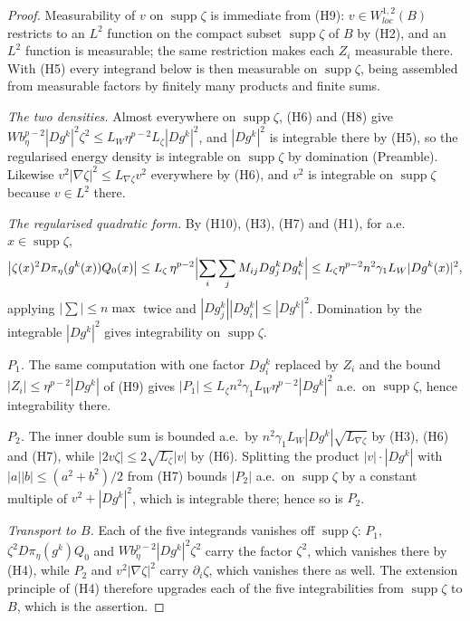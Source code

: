 \begin{proof}
Measurability of $v$ on $\operatorname{supp}\zeta$ is immediate from (H9):
$v\in W^{1,2}_{loc}(B)$ restricts to an $L^2$ function on the compact subset
$\operatorname{supp}\zeta$ of $B$ by (H2), and an $L^2$ function is
measurable; the same restriction makes each $Z_i$ measurable there.  With (H5)
every integrand below is then measurable on $\operatorname{supp}\zeta$, being
assembled from measurable factors by finitely many products and finite sums.

\emph{The two densities.}  Almost everywhere on $\operatorname{supp}\zeta$,
(H6) and (H8) give
$Wb_\eta^{p-2}|Dg^k|^2\zeta^2\le L_W\eta^{p-2}L_\zeta|Dg^k|^2$, and
$|Dg^k|^2$ is integrable there by (H5), so the regularised energy density is
integrable on $\operatorname{supp}\zeta$ by domination (Preamble).  Likewise
$v^2|\nabla\zeta|^2\le L_{\nabla\zeta}v^2$ everywhere by (H6), and $v^2$ is
integrable on $\operatorname{supp}\zeta$ because $v\in L^2$ there.

\emph{The regularised quadratic form.}  By (H10), (H3), (H7) and (H1), for
a.e.\ $x\in\operatorname{supp}\zeta$,
\[
\bigl|\zeta(x)^2D\pi_\eta(g^k(x))Q_0(x)\bigr|
\le L_\zeta\,\eta^{p-2}\Bigl|\sum_i\sum_jM_{ij}Dg^k_jDg^k_i\Bigr|
\le L_\zeta\eta^{p-2}n^2\gamma_1L_W|Dg^k(x)|^2 ,
\]
applying $|\sum|\le n\max$ twice and $|Dg^k_j||Dg^k_i|\le|Dg^k|^2$.
Domination by the integrable $|Dg^k|^2$ gives integrability on
$\operatorname{supp}\zeta$.

\emph{$P_1$.}  The same computation with one factor $Dg^k_i$ replaced by $Z_i$
and the bound $|Z_i|\le\eta^{p-2}|Dg^k|$ of (H9) gives
$|P_1|\le L_\zeta n^2\gamma_1L_W\eta^{p-2}|Dg^k|^2$ a.e.\ on
$\operatorname{supp}\zeta$, hence integrability there.

\emph{$P_2$.}  The inner double sum is bounded a.e.\ by
$n^2\gamma_1L_W|Dg^k|\sqrt{L_{\nabla\zeta}}$ by (H3), (H6) and (H7), while
$|2v\zeta|\le2\sqrt{L_\zeta}|v|$ by (H6).  Splitting the product
$|v|\cdot|Dg^k|$ with $|a||b|\le(a^2+b^2)/2$ from (H7) bounds $|P_2|$ a.e.\ on
$\operatorname{supp}\zeta$ by a constant multiple of $v^2+|Dg^k|^2$, which is
integrable there; hence so is $P_2$.

\emph{Transport to $B$.}  Each of the five integrands vanishes off
$\operatorname{supp}\zeta$: $P_1$, $\zeta^2D\pi_\eta(g^k)Q_0$ and
$Wb_\eta^{p-2}|Dg^k|^2\zeta^2$ carry the factor $\zeta^2$, which vanishes there
by (H4), while $P_2$ and $v^2|\nabla\zeta|^2$ carry $\partial_i\zeta$, which
vanishes there as well.  The extension principle of (H4) therefore upgrades
each of the five integrabilities from $\operatorname{supp}\zeta$ to $B$, which
is the assertion.
\end{proof}
